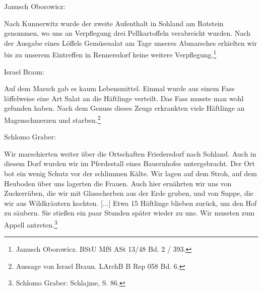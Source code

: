 Janusch Oborowicz:
\begin{leftbar}   
Nach Kunnerwitz wurde der zweite Aufenthalt in Sohland am Rotstein genommen, wo uns an Verpflegung drei Pellkartoffeln verabreicht wurden. Nach der Ausgabe eines Löffels Gemüsesalat am Tage unseres Abmarsches erhielten wir bis zu unserem Eintreffen in Rennersdorf keine weitere Verpflegung.\footnote{Janusch Oborowicz. BStU MfS ASt 13/48 Bd. 2 / 393. }
\end{leftbar}
Israel Braun:
\begin{leftbar}   
Auf dem Marsch gab es kaum Lebensmittel. Einmal wurde aus einem Fass löffelweise eine Art Salat an die Häftlinge verteilt. Das Fass musste man wohl gefunden haben. Nach dem Genuss dieses Zeugs erkrankten viele Häftlinge an Magenschmerzen und starben.\footnote{Aussage von Israel Braun. LArchB B Rep 058 Bd. 6.}
\end{leftbar}

\newpage
Schlomo Graber:
\begin{leftbar}   
Wir marschierten weiter über die Ortschaften Friedersdorf nach Sohland. Auch in diesem Dorf wurden wir im Pferdestall eines Bauernhofes untergebracht. Der Ort bot ein wenig Schutz vor der schlimmen Kälte. Wir lagen auf dem Stroh, auf dem Heuboden über uns lagerten die Frauen. Auch hier ernährten wir uns von Zuckerrüben, die wir mit Glasscherben aus der Erde gruben, und von Suppe, die wir aus Wildkräutern kochten. [...] Etwa 15 Häftlinge blieben zurück, um den Hof zu säubern. Sie stießen ein paar Stunden später wieder zu uns. Wir mussten zum Appell antreten.\footnote{Schlomo Graber: Schlajme, S. 86.}
\end{leftbar}





